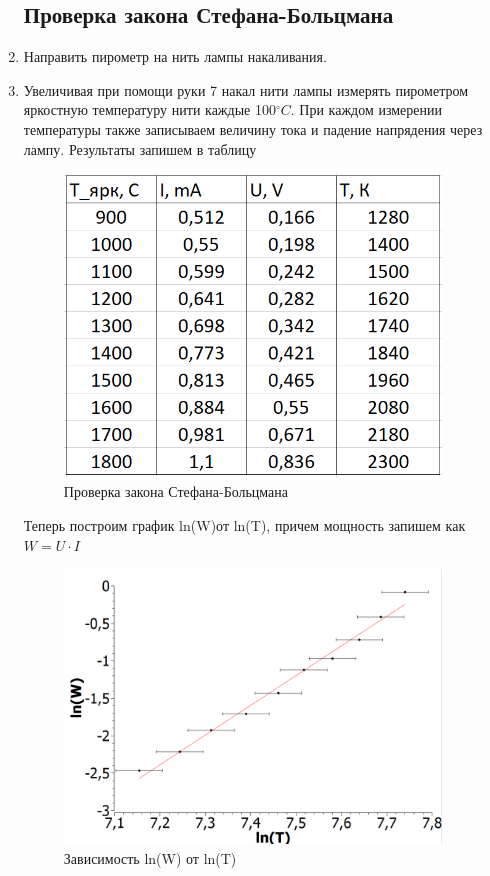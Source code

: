 \documentclass[a4paper, 12pt]{article}%
\begin{document}
\begin{enumerate}
\subsection{Проверка закона Стефана-Больцмана}
\item Направить пирометр на нить лампы накаливания.

\item Увеличивая при помощи руки 7 накал нити лампы измерять пирометром яркостную температуру нити каждые 100$^{\circ}C$. При каждом измерении температуры также записываем величину тока и падение напрядения через лампу. Результаты запишем в таблицу

\begin{figure}[h]
    \centering
    \includegraphics[width=10cm]{table_1.PNG}
    \caption{Проверка закона Стефана-Больцмана}
    \label{fig:table_1}
\end{figure}

Теперь построим график ln(W)от ln(T), причем мощность запишем как $W = U \cdot I$

\begin{figure}[h]
    \centering
    \includegraphics[width=10cm]{graph_1.PNG}
    \caption{Зависимость ln(W) от ln(T)}
    \label{fig:table_1}
\end{figure}


\end{enumerate}
\end{document}
